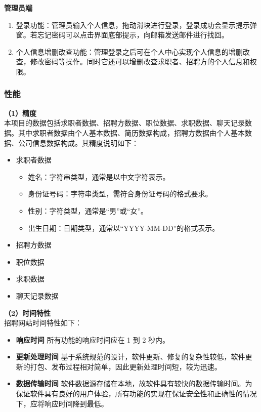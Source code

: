 \documentclass[UTF8,a4paper,10pt]{ctexart}
\begin{document}
\textbf{管理员端}
\begin{enumerate}
    \item 登录功能：管理员输入个人信息，拖动滑块进行登录，登录成功会显示提示弹窗。若忘记密码可以点击界面底部提示，向邮箱发送邮件进行找回。
    \item 个人信息增删改查功能：管理登录之后可在个人中心实现个人信息的增删改查，修改密码等操作。同时它还可以增删改查求职者、招聘方的个人信息和权限。
\end{enumerate}

\subsubsection{性能}

\textbf{（1）精度}\\
本项目的数据包括求职者数据、招聘方数据、职位数据、求职数据、聊天记录数据。其中求职者数据由个人基本数据、简历数据构成，招聘方数据由个人基本数据、公司信息数据构成。其精度说明如下：

\begin{itemize}
    \item 求职者数据
        \begin{itemize}
            \item 姓名：字符串类型，通常是以中文字符表示。
            \item 身份证号码：字符串类型，需符合身份证号码的格式要求。
            \item 性别：字符类型，通常是“男”或“女”。
            \item 出生日期：日期类型，通常以“YYYY-MM-DD”的格式表示。
        \end{itemize}
    \item 招聘方数据
    \item 职位数据
    \item 求职数据
    \item 聊天记录数据
\end{itemize}

\textbf{（2）时间特性}\\
招聘网站时间特性如下：

\begin{itemize}
    \item \textbf{响应时间} \space 所有功能的响应时间应在 1 到 2 秒内。
    \item \textbf{更新处理时间} \space 基于系统规范的设计，软件更新、修复的复杂性较低，软件更新的打包、发布过程相对简单，因此更新处理时间短，较为迅速。
    \item \textbf{数据传输时间} \space 软件数据源存储在本地，故软件具有较快的数据传输时间。为保证软件具有良好的用户体验，所有功能的实现在保证安全性和正确性的情况下，应将响应时间降到最低。
\end{itemize}
\end{document}
